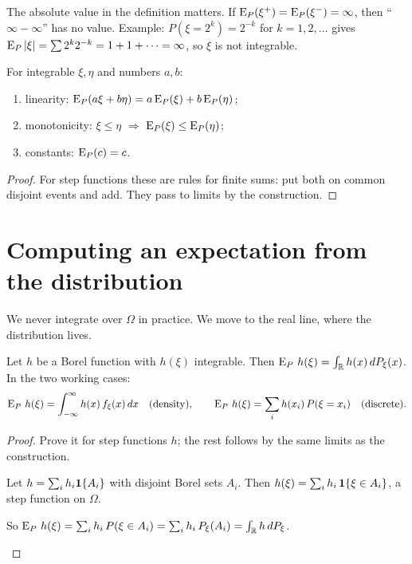 The absolute value in the definition matters. If $\operatorname{E}_P(\xi^+)=\operatorname{E}_P(\xi^-)=\infty$, then ``$\infty-\infty$'' has no value. Example: $P(\xi=2^k)=2^{-k}$ for $k=1,2,\ldots$ gives $\operatorname{E}_P|\xi|=\sum 2^k2^{-k}=1+1+\cdots=\infty$, so $\xi$ is not integrable.

\begin{result}
\label{res:E-rules}
For integrable $\xi,\eta$ and numbers $a,b$:
\begin{enumerate}[label=(\alph*)]
  \item linearity: $\operatorname{E}_P(a\xi+b\eta)=a\operatorname{E}_P(\xi)+b\operatorname{E}_P(\eta)$;
  \item monotonicity: $\xi\le\eta$ $\Rightarrow$ $\operatorname{E}_P(\xi)\le\operatorname{E}_P(\eta)$;
  \item constants: $\operatorname{E}_P(c)=c$.
\end{enumerate}
\end{result}
\begin{proof}
For step functions these are rules for finite sums: put both on common disjoint events and add. They pass to limits by the construction.
\end{proof}

\section{Computing an expectation from the distribution}

We never integrate over $\Omega$ in practice. We move to the real line, where the distribution lives.

\begin{theorem}
\label{thm:lotus}
Let $h$ be a Borel function with $h(\xi)$ integrable. Then $\operatorname{E}_P\,h(\xi)=\int_{\mathbb{R}} h(x)\,dP_\xi(x)$. In the two working cases:
\[
  \operatorname{E}_P\,h(\xi)=\int_{-\infty}^{\infty}h(x)\,f_\xi(x)\,dx\quad\text{(density)},\qquad
  \operatorname{E}_P\,h(\xi)=\sum_i h(x_i)\,P(\xi=x_i)\quad\text{(discrete)}.
\]
\end{theorem}
\begin{proof}
Prove it for step functions $h$; the rest follows by the same limits as the construction.
\begin{steps}
  \item Let $h=\sum_i h_i\mathbf{1}\{A_i\}$ with disjoint Borel sets $A_i$. Then $h(\xi)=\sum_ih_i\,\mathbf{1}\{\xi\in A_i\}$, a step function on $\Omega$.
  \item So $\operatorname{E}_P\,h(\xi)=\sum_ih_i\,P(\xi\in A_i)=\sum_ih_i\,P_\xi(A_i)=\int_{\mathbb{R}} h\,dP_\xi$. \qedhere
\end{steps}
\end{proof}

